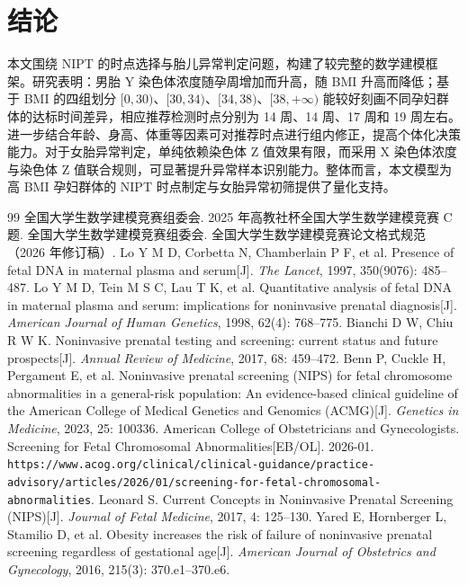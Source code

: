 ﻿\documentclass[12pt,a4paper]{article}
\begin{document}
\section{结论}
本文围绕 NIPT 的时点选择与胎儿异常判定问题，构建了较完整的数学建模框架。研究表明：男胎 Y 染色体浓度随孕周增加而升高，随 BMI 升高而降低；基于 BMI 的四组划分 $[0,30)$、$[30,34)$、$[34,38)$、$[38,+\infty)$ 能较好刻画不同孕妇群体的达标时间差异，相应推荐检测时点分别为 14 周、14 周、17 周和 19 周左右。进一步结合年龄、身高、体重等因素可对推荐时点进行组内修正，提高个体化决策能力。对于女胎异常判定，单纯依赖染色体 Z 值效果有限，而采用 X 染色体浓度与染色体 Z 值联合规则，可显著提升异常样本识别能力。整体而言，本文模型为高 BMI 孕妇群体的 NIPT 时点制定与女胎异常初筛提供了量化支持。

\begin{thebibliography}{99}
 全国大学生数学建模竞赛组委会. 2025 年高教社杯全国大学生数学建模竞赛 C 题.
 全国大学生数学建模竞赛组委会. 全国大学生数学建模竞赛论文格式规范（2026 年修订稿）.
 Lo Y M D, Corbetta N, Chamberlain P F, et al. Presence of fetal DNA in maternal plasma and serum[J]. \textit{The Lancet}, 1997, 350(9076): 485--487.
 Lo Y M D, Tein M S C, Lau T K, et al. Quantitative analysis of fetal DNA in maternal plasma and serum: implications for noninvasive prenatal diagnosis[J]. \textit{American Journal of Human Genetics}, 1998, 62(4): 768--775.
 Bianchi D W, Chiu R W K. Noninvasive prenatal testing and screening: current status and future prospects[J]. \textit{Annual Review of Medicine}, 2017, 68: 459--472.
 Benn P, Cuckle H, Pergament E, et al. Noninvasive prenatal screening (NIPS) for fetal chromosome abnormalities in a general-risk population: An evidence-based clinical guideline of the American College of Medical Genetics and Genomics (ACMG)[J]. \textit{Genetics in Medicine}, 2023, 25: 100336.
 American College of Obstetricians and Gynecologists. Screening for Fetal Chromosomal Abnormalities[EB/OL]. 2026-01. \texttt{https://www.acog.org/clinical/clinical-guidance/practice-advisory/articles/2026/01/screening-for-fetal-chromosomal-abnormalities}.
 Leonard S. Current Concepts in Noninvasive Prenatal Screening (NIPS)[J]. \textit{Journal of Fetal Medicine}, 2017, 4: 125--130.
 Yared E, Hornberger L, Stamilio D, et al. Obesity increases the risk of failure of noninvasive prenatal screening regardless of gestational age[J]. \textit{American Journal of Obstetrics and Gynecology}, 2016, 215(3): 370.e1--370.e6.

\end{thebibliography}
\end{document}
